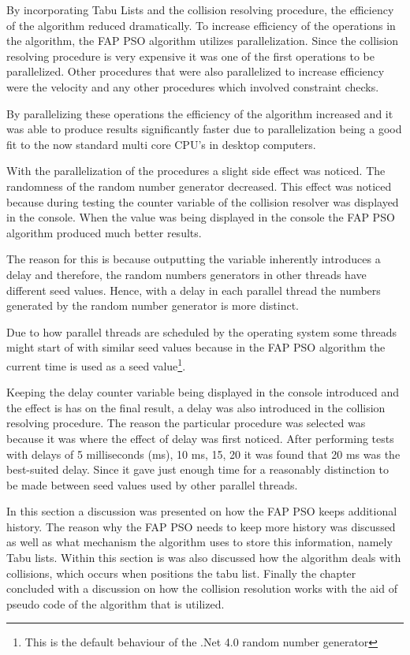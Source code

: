 By incorporating Tabu Lists and the collision resolving procedure, the efficiency of the algorithm reduced dramatically. To increase efficiency of the operations in the algorithm, the FAP PSO algorithm utilizes parallelization. Since the collision resolving procedure is very expensive it was one of the first operations to be parallelized. Other procedures that were also parallelized to increase efficiency were the velocity and any other procedures which involved constraint checks.

By parallelizing these operations the efficiency of the algorithm increased and it was able to produce results significantly faster due to parallelization being a good fit to the now standard multi core CPU's in desktop computers.

With the parallelization of the procedures a slight side effect was noticed. The randomness of the random number generator decreased. This effect was noticed because during testing the counter variable of the collision resolver was displayed in the console. When the value was being displayed in the console the FAP PSO algorithm produced much better results. 

The reason for this is because outputting the variable inherently introduces a delay and therefore, the random numbers generators in other threads have different seed values. Hence, with a delay in each parallel thread the numbers generated by the random number generator is more distinct. 

Due to how parallel threads are scheduled by the operating system some threads might start of with similar seed values because in  the FAP PSO algorithm the current time is used as a seed value\footnote{This is the default behaviour of the .Net 4.0 random number generator}.

Keeping the delay counter variable being displayed in the console introduced and the effect is has on the final result, a delay was also introduced in the collision resolving procedure. The reason the particular procedure was selected was because it was where the effect of delay was first noticed. After performing tests with delays of 5 milliseconds (ms), 10 ms, 15, 20 it was found that 20 ms was the best-suited delay. Since it gave just enough time for a reasonably distinction to be made between seed values used by other parallel threads.

In this section a discussion was presented on how the FAP PSO keeps additional history. The reason why the FAP PSO needs to keep more history was discussed as well as what mechanism the algorithm uses to store this information, namely Tabu lists. Within this section is was also discussed how the algorithm deals with collisions, which occurs when positions the tabu list. Finally the chapter concluded with a discussion on how the collision resolution works with the aid of pseudo code of the algorithm that is utilized.

